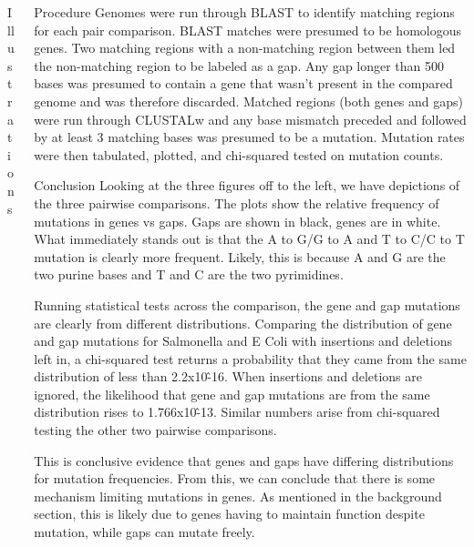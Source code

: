 \documentclass[final]{beamer}
\begin{document}
\begin{frame}{}
\begin{columns}[t]
\begin{column}{.32 \linewidth}
\begin{block}{\large Illustrations}
\end{block}


\end{column}




\begin{column}{.32 \linewidth}

\begin{block}{Procedure}
Genomes were run through BLAST to identify matching regions for each pair comparison. BLAST matches were presumed to be homologous genes. Two matching regions with a non-matching region between them led the non-matching region to be labeled as a gap. Any gap longer than 500 bases was presumed to contain a gene that wasn't present in the compared genome and was therefore discarded.
\newline
Matched regions (both genes and gaps) were run through CLUSTALw and any base mismatch preceded and followed by at least 3 matching bases was presumed to be a mutation. Mutation rates were then tabulated, plotted, and chi-squared tested on mutation counts.
\end{block}
\begin{block}{\large Conclusion}
Looking at the three figures off to the left, we have depictions of the three pairwise comparisons. The plots show the relative frequency of mutations in genes vs gaps. Gaps are shown in black, genes are in white. What immediately stands out is that the A to G/G to A and T to C/C to T mutation is clearly more frequent. Likely, this is because A and G are the two purine bases and T and C are the two pyrimidines.

Running statistical tests across the comparison, the gene and gap mutations are clearly from different distributions. Comparing the distribution of gene and gap mutations for Salmonella and E Coli with insertions and deletions left in, a chi-squared test returns a probability that they came from the same distribution of less than 2.2x10\^-16. When insertions and deletions are ignored, the likelihood that gene and gap mutations are from the same distribution rises to 1.766x10\^-13. Similar numbers arise from chi-squared testing the other two pairwise comparisons. 

This is conclusive evidence that genes and gaps have differing distributions for mutation frequencies. From this, we can conclude that there is some mechanism limiting mutations in genes. As mentioned in the background section, this is likely due to genes having to maintain function despite mutation, while gaps can mutate freely.




\end{block}
\end{column}
\end{columns}
\end{frame}
\end{document}
